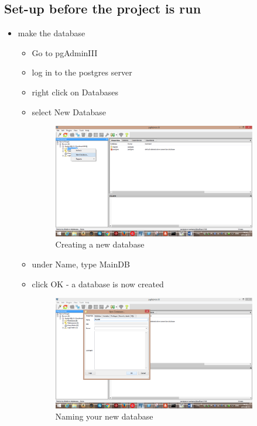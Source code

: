 \documentclass[paper=a4, fontsize=11pt]{scrartcl} %
\numberwithin{equation}{section} %
\numberwithin{figure}{section} %
\numberwithin{table}{section} %
\begin{document}
\subsection{Set-up before the project is run}
\begin{itemize}
\item make the database
\begin{itemize}
\item Go to pgAdminIII
\item log in to the postgres server
\item right click on Databases
\item select New Database

\begin{figure}[hbt!]
\centering
\includegraphics[width=3.5in]{pictures/postgresnewdb.png}
\caption{Creating a new database}
\label{DBCreation}
\end{figure}

\item under Name, type MainDB
\item click OK - a database is now created

\begin{figure}[hbt!]
\centering
\includegraphics[width=3.5in]{pictures/postgresDBName.png}
\caption{Naming your new database}
\label{DbNaming}
\end{figure}

\end{itemize}
\end{itemize}
\end{document}
